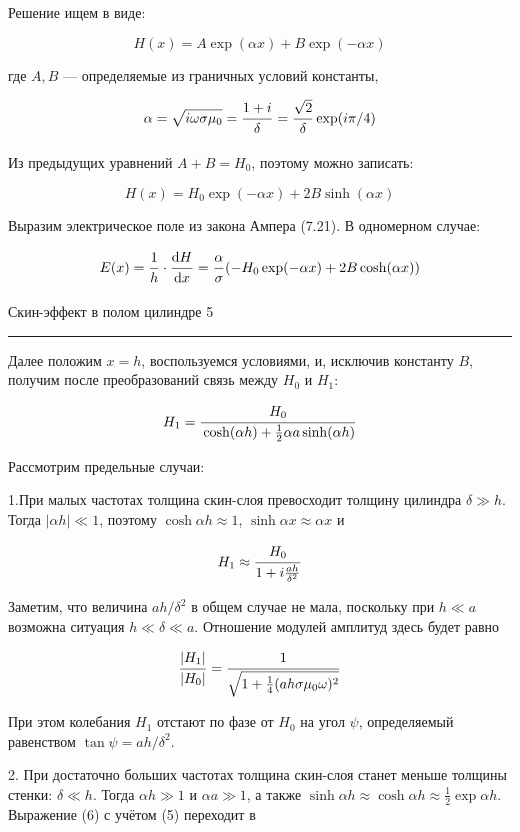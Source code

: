 \documentclass[12pt,a4paper]{scrartcl}
\begin{document}
	Решение ищем в виде:
	
	$$H(x) = A\exp(\alpha x) + B\exp(-\alpha x)$$
	
	где $A, B$ — определяемые из граничных условий константы,
	
	$$\alpha = \sqrt{i \omega \sigma \mu_0} = \dfrac{\strut 1 + i}{\strut \delta} = \dfrac{\strut \sqrt{2}}{\strut \delta}\exp(i\pi / 4)$$
	
	Из предыдущих уравнений $A + B = H_0$, поэтому можно записать:
	
	$$H(x) = H_0\exp(-\alpha x) + 2B\sinh (\alpha x)$$
	
	Выразим электрическое поле из закона Ампера (7.21). В одномерном случае:
	
	$$E(x) = \dfrac{\strut 1}{\strut h} \cdot \dfrac{\strut \mathrm{d} H}{\strut \mathrm{d} x} = \dfrac{\strut \alpha}{\strut \sigma}(-H_0\exp(-\alpha x) + 2B \cosh(\alpha x))$$
	
	
	\newpage
	
	\begin{flushleft}
		\footnotesize{Скин-эффект в полом цилиндре} \hspace{\fill} \footnotesize{5}
		\\[-0.3cm]\noindent\rule{\textwidth}{0.3pt}
	\end{flushleft}
	
	Далее положим $x = h$, воспользуемся условиями, и, исключив константу $B$, получим после преобразований связь между $H_0$ и $H_1$:
	
	$$H_1 = \dfrac{\strut H_0}{\strut \cosh(\alpha h) + \frac{1}{2}\alpha a \sinh(\alpha h)}$$
	
	Рассмотрим предельные случаи:
	
	1.При малых частотах толщина скин-слоя превосходит толщину цилиндра $\delta \gg h$. Тогда $|\alpha h| \ll 1$, поэтому $\cosh \alpha h \approx 1$, $\sinh \alpha x \approx \alpha x$ и
	
	$$H_1 \approx \dfrac{\strut H_0}{\strut 1 + i\frac{ah}{\delta^2}}$$
	
	Заметим, что величина $ah / \delta^2$ в общем случае не мала, поскольку при	$h \ll a$ возможна ситуация $h \ll \delta \ll a$. Отношение модулей амплитуд здесь будет равно
	
	$$\dfrac{\strut |H_1|}{\strut |H_0|} = \dfrac{\strut 1}{\strut \sqrt{1 + \frac{1}{4} (ah\sigma \mu_0 \omega)^2}}$$
	
	При этом колебания $H_1$ отстают по фазе от $H_0$ на угол $\psi$, определяемый равенством $\tan \psi = ah / \delta^2$.
	
	2. При достаточно больших частотах толщина скин-слоя станет меньше толщины стенки: $\delta \ll h$. Тогда $\alpha h \gg 1$ и $\alpha a \gg 1$, а также $\sinh \alpha h \approx \cosh \alpha h \approx \frac{1}{2} \exp{\alpha h}$. Выражение (6) с учётом (5) переходит в
	
\end{document}
